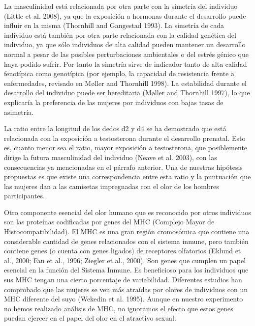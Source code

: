 \documentclass[fleqn,10pt]{SelfArx} %
\begin{document}
La masculinidad está relacionada por otra parte con la simetría del individuo (Little et al. 2008), ya que la exposición a hormonas durante el desarrollo puede influir en la misma (Thornhill and Gangestad 1993). La simetría de cada individuo está también por otra parte relacionada con la calidad genética del individuo, ya que sólo individuos de alta calidad pueden mantener un desarrollo normal a pesar de las posibles perturbaciones ambientales o del estrés génico que haya podido sufrir. Por tanto la simetría sirve de indicador tanto de alta calidad fenotípica como genotípica (por ejemplo, la capacidad de resistencia frente a enfermedades, revisado en Møller and Thornhill 1998). La estabilidad durante el desarrollo del individuo puede ser hereditaria (Møller and Thornhill 1997), lo que explicaría la preferencia de las mujeres por individuos con bajas tasas de asimetría.

La ratio entre la longitud de los dedos d2 y d4 se ha demostrado que está relacionada con la exposición a testosterona durante el desarrollo prenatal. Esto es, cuanto menor sea el ratio, mayor exposición a testosterona, que posiblemente dirige la futura masculinidad del individuo (Neave et al. 2003), con las consecuencias ya mencionadas en el párrafo anterior. Una de nuestras hipótesis propuestas es que existe una correspondencia entre esta ratio y la puntuación que las mujeres dan a las camisetas impregnadas con el olor de los hombres participantes.

Otro componente esencial del olor humano que es reconocido por otros individuos son las proteínas codificadas por genes del MHC (Complejo Mayor de Histocompatibilidad). El MHC es una gran región cromosómica que contiene una considerable cantidad de genes relacionados con el sistema inmune, pero también contiene genes (o cuenta con genes ligados) de receptores olfatorios (Eklund et al., 2000; Fan et al., 1996; Ziegler et al., 2000). Son genes que cumplen un papel esencial en la función del Sistema Inmune. Es beneficioso para los individuos que sus MHC tengan una cierto porcentaje de variabilidad. Diferentes estudios han comprobado que las mujeres se ven más atraídas por olores de individuos con un MHC diferente del suyo (Wekedin et al. 1995). Aunque en nuestro experimento no hemos realizado análisis de MHC, no ignoramos el efecto que estos genes puedan ejercer en el papel del olor en el atractivo sexual.
\end{document}
